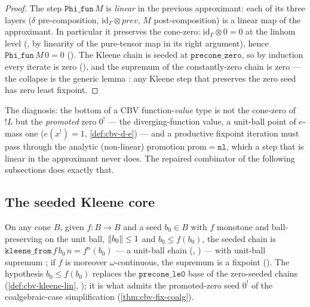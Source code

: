 \begin{proof}
The step $\mathtt{Phi\_fun}\,M$ is \emph{linear} in the previous
approximant: each of its three layers ($\delta$ pre-composition,
$\mathrm{id}_\Gamma \otimes \mathit{prev}$, $M$ post-composition) is a
linear map of the approximant. In particular it preserves the cone-zero:
$\mathrm{id}_\Gamma \otimes 0 = 0$ at the linhom level
(, by
linearity of the pure-tensor map in its right argument), hence
$\mathtt{Phi\_fun}\,M\,0 = 0$
(). The Kleene
chain is seeded at $\mathtt{precone\_zero}$, so by induction every
iterate is zero
(), and
the supremum of the constantly-zero chain is zero --- the collapse is
the generic lemma : any Kleene
step that preserves the zero seed has zero least fixpoint.
\end{proof}

The diagnosis: the bottom of a CBV function-\emph{value} type is not
the cone-zero of $\mathord{!}L$ but the \emph{promoted} zero $0^!$ ---
the diverging-function value, a unit-ball point of $e$-mass one
($e(x^!) = 1$, \autoref{def:cbv-d-e}) --- and a productive fixpoint
iteration must pass through the analytic (non-linear) promotion
$\mathrm{prom} = \mathtt{nl}$, which a step that is linear in the
approximant never does. The repaired combinator of the following
subsections does exactly that.

\subsection{The seeded Kleene core}%
\label{ssec:cbv-seeded-kleene}

\begin{definition}%
\label{def:cbv-kleene-from}
\rocqok
{}\rocqok
{}\rocqok
{}
On any cone $B$, given $f : B \to B$ and a seed $b_0 \in B$ with $f$
monotone and ball-preserving on the unit ball, $\lVert b_0 \rVert \leq 1$ and
$b_0 \leq f(b_0)$, the seeded chain is
$\mathtt{kleene\_from}\,f\,b_0\,n = f^n(b_0)$ --- a unit-ball chain
(,
) --- with
unit-ball supremum
; if $f$ is moreover
$\omega$-continuous, the supremum is a fixpoint
(). The
hypothesis $b_0 \leq f(b_0)$ replaces the $\mathtt{precone\_le0}$ base
of the zero-seeded chains (\autoref{def:cbv-kleene-lin},
); it is what admits the promoted-zero
seed $0^!$ of the coalgebraic-case simplification
(\autoref{thm:cbv-fix-coalg}).
\end{definition}

